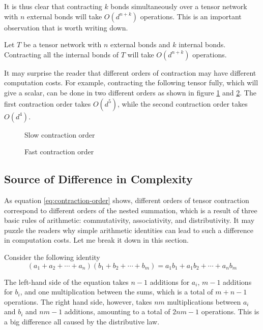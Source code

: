 It is thus clear that contracting $k$ bonds simultaneously over a tensor network with $n$ external bonds will take $O(d^{n+k})$ operations.
This is an important observation that is worth writing down.

\begin{lemma}\label{lem:contraction-complexity}
	Let $T$ be a tensor network with $n$ external bonds and $k$ internal bonds. 
	Contracting all the internal bonds of $T$ will take $O(d^{n+k})$ operations.
\end{lemma}

It may surprise the reader that different orders of contraction may have different computation costs.
For example, contracting the following tensor fully, which will give a scalar, can be done in two different orders as shown in figure \ref{fig:contract-order-slow} and \ref{fig:contract-order-fast}.
The first contraction order takes $O(d^5)$, while the second contraction order takes $O(d^4)$.

\begin{figure}[ht]
	\centering
	
	\caption{Slow contraction order}
	\label{fig:contract-order-slow}
\end{figure}
\begin{figure}[ht]
	\centering
	
	\caption{Fast contraction order}
	\label{fig:contract-order-fast}
\end{figure}

\subsection{Source of Difference in Complexity}

As equation \eqref{eq:contraction-order} shows, different orders of tensor contraction correspond to different orders of the nested summation, which is a result of three basic rules of arithmetic: commutativity, associativity, and distributivity.
It may puzzle the readers why simple arithmetic identities can lead to such a difference in computation costs.
Let me break it down in this section.

Consider the following identity
$$
	(a_1 + a_2 + \cdots + a_n)(b_1 + b_2 + \cdots + b_m) = a_1 b_1 + a_1 b_2 + \cdots + a_n b_m
$$

The left-hand side of the equation takes $n-1$ additions for $a_i$, $m-1$ additions for $b_i$, and one multiplication between the sums, which is a total of $m+n -1$ operations.
The right hand side, however, takes $nm$ multiplications between $a_i$ and $b_i$ and $nm-1$ additions, amounting to a total of $2nm - 1$ operations. 
This is a big difference all caused by the distributive law.


